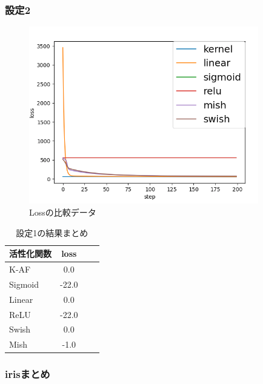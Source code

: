 \subsubsection{設定2}

\begin{figure}[hbtp]
    \begin{center}
        \includegraphics[width=10cm]{asset/boston_0000001_SGDkaiming_normal__non_200.png}
            \caption{Lossの比較データ}
            \label{boston}
    \end{center}
\end{figure}


\begin{table}[htbp]
    \begin{center}
        \caption{設定1の結果まとめ}
        \vspace{5mm} 
        \begin{tabular}{l*{2}{c}r}
            活性化関数              & loss \\
            \hline
            K-AF            & 0.0 \\
            Sigmoid            & -22.0 \\
            Linear            & 0.0 \\
            ReLU        & -22.0 \\
            Swish           & 0.0 \\
            Mish           & -1.0 \\
    
        \end{tabular}
    \end{center}
\end{table}


\subsubsection{irisまとめ}

